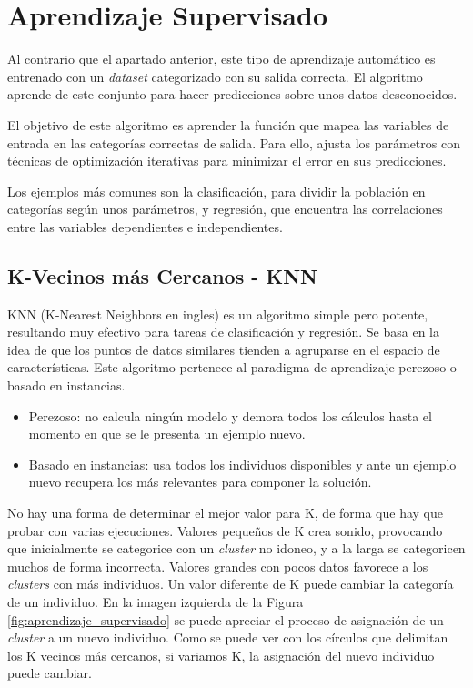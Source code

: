 \section{Aprendizaje Supervisado}
	Al contrario que el apartado anterior, este tipo de aprendizaje automático es entrenado con un \textit{dataset} categorizado con su salida correcta. El algoritmo aprende de este conjunto para hacer predicciones sobre unos datos desconocidos.
	
	El objetivo de este algoritmo es aprender la función que mapea las variables de entrada en las categorías correctas de salida. Para ello, ajusta los parámetros con técnicas de optimización iterativas para minimizar el error en sus predicciones.
	
	Los ejemplos más comunes son la clasificación, para dividir la población en categorías según unos parámetros, y regresión, que encuentra las correlaciones entre las variables dependientes e independientes.


	\subsection{K-Vecinos más Cercanos - KNN}

		KNN (K-Nearest Neighbors en ingles) es un algoritmo simple pero potente, resultando muy efectivo para tareas de clasificación y regresión. Se basa en la idea de que los puntos de datos similares tienden a agruparse en el espacio de características. Este algoritmo pertenece al paradigma de aprendizaje perezoso o basado en instancias.
		
		\begin{itemize}
			\item Perezoso: no calcula ningún modelo y demora todos los cálculos hasta el momento en que se le presenta un ejemplo nuevo.			
			\item Basado en instancias: usa todos los individuos disponibles y ante un ejemplo nuevo recupera los más relevantes para componer la solución.	
		\end{itemize}
		
		No hay una forma de determinar el mejor valor para K, de forma que hay que probar con varias ejecuciones. Valores pequeños de K crea sonido, provocando que inicialmente se categorice con un \textit{cluster} no idoneo, y a la larga se categoricen muchos de forma incorrecta. Valores grandes con pocos datos favorece a los \textit{clusters} con más individuos. Un valor diferente de K puede cambiar la categoría de un individuo. En la imagen izquierda de la Figura \ref{fig:aprendizaje_supervisado} se puede apreciar el proceso de asignación de un \textit{cluster} a un nuevo individuo. Como se puede ver con los círculos que delimitan los K vecinos más cercanos, si variamos K, la asignación del nuevo individuo puede cambiar.

